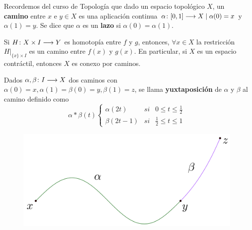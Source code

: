 \documentclass[GTS.tex]{subfiles}
\begin{document}
Recordemos del curso de Topología que dado un espacio topológico $X$, un \textbf{camino} entre $x$ e $y\in X$ es una aplicación continua $\alpha\colon{[0,1]}\longrightarrow{X}\mid\alpha(0)=x$ y $\alpha(1)=y$. Se dice que $\alpha$ es un \textbf{lazo} si $\alpha(0)=\alpha(1)$.


\begin{ejer}[Importante] Si $H\colon{X\times I}\longrightarrow{Y}$ es homotopía entre $f$ y $g$, entonces, $\forall x\in X$ la restricción $H\big|_{\{x\}\times I}$ es un camino entre $f(x)$ y $g(x)$. En particular, si $X$ es un espacio contráctil, entonces $X$ es conexo por caminos.
\end{ejer}

\begin{defi} Dados $\alpha,\beta\colon{I}\longrightarrow{X}$ dos caminos con $\alpha(0)=x,\alpha(1)=\beta(0)=y,\beta(1)=z$, se llama \textbf{yuxtaposición} de $\alpha$ y $\beta$ al camino definido como
\begin{equation*}
\alpha*\beta(t)\left\{\begin{array}{lcc}
\alpha(2t) & si & 0\leq t\leq\frac{1}{2}\\
\beta(2t-1) & si & \frac{1}{2}\leq t\leq 1

\end{array}\right.
\end{equation*}
\end{defi}
\begin{figure}[h!]
	\centering
	\includegraphics[scale=0.]{yux}
\end{figure}
\end{document}
